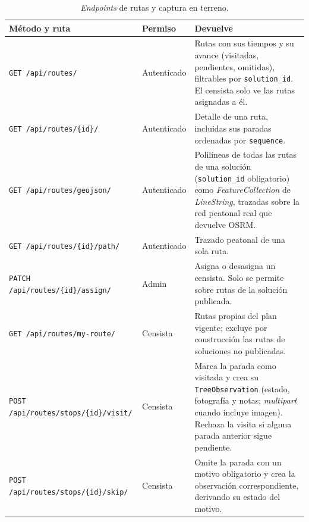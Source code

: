 \begin{table}[H]
  \centering
  \caption{\textit{Endpoints} de rutas y captura en terreno.}
  \label{tab:anexo_api_routes}
  \small
  \begin{tabularx}{\textwidth}{@{}p{5.5cm} p{1.9cm} X@{}}
    \toprule
    Método y ruta &
      Permiso &
      Devuelve \\
    \midrule
    \texttt{GET \slash api\slash routes\slash } &
      Autenticado &
      Rutas con sus tiempos y su avance (visitadas, pendientes, omitidas), filtrables por
      \texttt{solution\_id}. El censista solo ve las rutas asignadas a él. \\
    \texttt{GET \slash api\slash routes\slash \{id\}\slash } &
      Autenticado &
      Detalle de una ruta, incluidas sus paradas ordenadas por \texttt{sequence}. \\
    \texttt{GET \slash api\slash routes\slash geojson\slash } &
      Autenticado &
      Polilíneas de todas las rutas de una solución (\texttt{solution\_id} obligatorio) como
      \textit{FeatureCollection} de \textit{LineString}, trazadas sobre la red peatonal real
      que devuelve OSRM. \\
    \texttt{GET \slash api\slash routes\slash \{id\}\slash path\slash } &
      Autenticado &
      Trazado peatonal de una sola ruta. \\
    \texttt{PATCH \slash api\slash routes\slash \{id\}\slash assign\slash } &
      Admin &
      Asigna o desasigna un censista. Solo se permite sobre rutas de la solución publicada. \\
    \texttt{GET \slash api\slash routes\slash my-route\slash } &
      Censista &
      Rutas propias del plan vigente; excluye por construcción las rutas de soluciones no
      publicadas. \\
    \texttt{POST \slash api\slash routes\slash stops\slash \{id\}\slash visit\slash } &
      Censista &
      Marca la parada como visitada y crea su \texttt{TreeObservation} (estado, fotografía y
      notas; \textit{multipart} cuando incluye imagen). Rechaza la visita si alguna parada
      anterior sigue pendiente. \\
    \texttt{POST \slash api\slash routes\slash stops\slash \{id\}\slash skip\slash } &
      Censista &
      Omite la parada con un motivo obligatorio y crea la observación correspondiente,
      derivando su estado del motivo. \\
    \bottomrule
  \end{tabularx}
\end{table}

